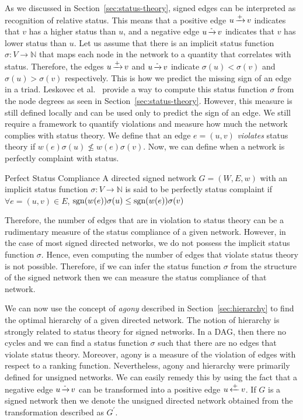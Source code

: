 As we discussed in Section~\ref{sec:status-theory}, signed edges can be interpreted as recognition of relative status.
This means that a positive edge $u \operatorname*{\xrightarrow{+}} v$ indicates that $v$ has a higher status than $u$, and a negative edge $u \operatorname*{\xrightarrow{-}} v$ indicates that $v$ has lower status than $u$.
Let us assume that there is an implicit status function $\sigma: V \rightarrow \mathbb{N}$ that maps each node in the network to a quantity that correlates with status.
Therefore, the edges $u\operatorname*{\xrightarrow{+}}
 v$ and $u \operatorname*{\xrightarrow{-}} v$ indicate $\sigma(u)<\sigma(v)$ and $\sigma(u)>\sigma(v)$ respectively.
This is how we predict the missing sign of an edge in a triad.
Leskovec et al.\ \cite{leskovec2010signed} provide a way to compute this status function $\sigma$ from the node degrees as seen in Section~\ref{sec:status-theory}.
However, this measure is still defined locally and can be used only to predict the sign of an edge.
We still require a framework to quantify violations and measure how much the network complies with status theory.
We define that an edge $e=(u,v)$ \textit{violates} status theory if $w(e)\sigma(u)\not\leq w(e)\sigma(v)$.
Now, we can define when a network is perfectly complaint with status.

 \theoremstyle{definition}
 \begin{definition}{Perfect Status Compliance}
     A directed signed network $G=(W,E,w)$ with an implicit status function $\sigma: V \rightarrow \mathbb{N}$ is said to be perfectly status complaint if $\forall e=(u,v) \in E$, $\operatorname*{sgn}(w(e))\sigma(u) \leq \operatorname*{sgn}(w(e))\sigma(v)$ 
 \end{definition}

Therefore, the number of edges that are in violation to status theory can be a rudimentary measure of the status compliance of a given network.
However, in the case of most signed directed networks, we do not possess the implicit status function $\sigma$.
Hence, even computing the number of edges that violate status theory is not possible.
Therefore, if we can infer the status function $\sigma$ from the structure of the signed network then we can measure the status compliance of that network. 

We can now use the concept of \textit{agony} described in Section~\ref{sec:hierarchy} to find the optimal hierarchy of a given directed network.
The notion of hierarchy is strongly related to status theory for signed networks.
In a DAG, then there no cycles and we can find a status function $\sigma$ such that there are no edges that violate status theory.
Moreover, agony is a measure of the violation of edges with respect to a ranking function.
Nevertheless, agony and hierarchy were primarily defined for unsigned networks.
We can easily remedy this by using the fact that a negative edge $u \operatorname*{\xrightarrow{-}} v$ can be transformed into a positive edge $u \operatorname*{\xleftarrow{+}} v$.
If $G$ is a signed network then we denote the unsigned directed network obtained from the transformation described as $G^\prime$.

